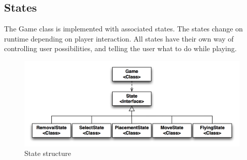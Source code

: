 \subsection{States}

The Game class is implemented with associated states. The states change on runtime depending on player interaction. All states have their own way of controlling user possibilities, and telling the user what to do while playing.

\begin{figure}[H]
\begin{center}
\includegraphics[width=\textwidth]{Images/states}
\caption{State structure}
\label{fig:states}
\end{center}
\end{figure}







